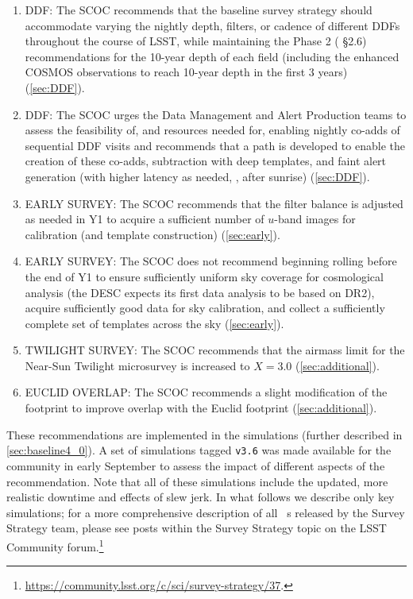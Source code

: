 \begin{enumerate}
\item  DDF: The SCOC recommends that the baseline survey strategy should accommodate varying the nightly depth, filters, or cadence of different DDFs throughout the course of LSST, while maintaining the Phase 2 ( \S2.6) recommendations for the 10-year depth of each field (including the enhanced COSMOS observations to reach 10-year depth in the first 3 years) (\autoref{sec:DDF}).

\item  DDF: The SCOC urges the Data Management and Alert Production teams to assess the feasibility of, and resources needed for, enabling nightly co-adds of sequential DDF visits and recommends that a path is developed to enable the creation of these co-adds, subtraction with deep templates, and faint alert generation (with higher latency as needed, \eg , after sunrise) (\autoref{sec:DDF}). 

\item  EARLY SURVEY: The SCOC recommends that the filter balance is adjusted as needed in Y1 to acquire a sufficient number of $u$-band images for calibration (and template construction) (\autoref{sec:early}). 

\item  EARLY SURVEY: The SCOC does not recommend beginning rolling before the end of Y1 to ensure sufficiently uniform sky coverage for cosmological analysis (the DESC expects its first data analysis to be based on DR2), acquire sufficiently good data for sky calibration, and collect a 
 sufficiently complete set of templates across the sky (\autoref{sec:early}).

\item  TWILIGHT SURVEY: The SCOC recommends that the airmass limit for the Near-Sun Twilight microsurvey is increased to $X=3.0$ (\autoref{sec:additional}).

\item  EUCLID OVERLAP: The SCOC recommends a slight modification of the  footprint to improve overlap with the Euclid footprint (\autoref{sec:additional}). 

\end{enumerate}

These recommendations are implemented in the  simulations (further described in \autoref{sec:baseline4_0}). A set of simulations tagged \texttt{v3.6} was made available for the community in early September to assess the impact of different aspects of the recommendation. Note that all of these simulations include the updated, more realistic downtime and effects of slew jerk. In what follows we describe only key simulations; for a more comprehensive description of all \opsim\ s released by the Survey Strategy team, please see posts within the Survey Strategy topic on the LSST Community forum.\footnote{\url{https://community.lsst.org/c/sci/survey-strategy/37}.}

